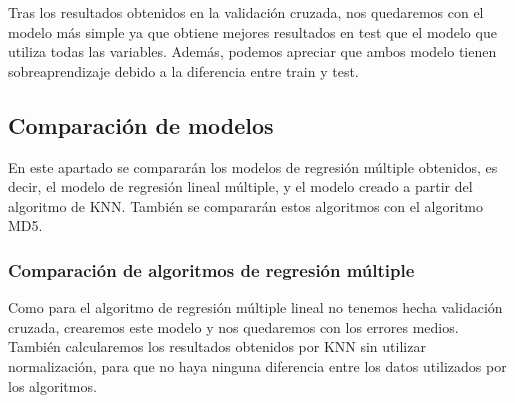 \documentclass[11pt]{article}
\begin{document}
    Tras los resultados obtenidos en la validación cruzada, nos quedaremos
con el modelo más simple ya que obtiene mejores resultados en test que
el modelo que utiliza todas las variables. Además, podemos apreciar que
ambos modelo tienen sobreaprendizaje debido a la diferencia entre train
y test.

    \hypertarget{comparaciuxf3n-de-modelos}{%
\subsection{Comparación de modelos}\label{comparaciuxf3n-de-modelos}}

En este apartado se compararán los modelos de regresión múltiple
obtenidos, es decir, el modelo de regresión lineal múltiple, y el modelo
creado a partir del algoritmo de KNN. También se compararán estos
algoritmos con el algoritmo MD5.

    \hypertarget{comparaciuxf3n-de-algoritmos-de-regresiuxf3n-muxfaltiple}{%
\subsubsection{Comparación de algoritmos de regresión
múltiple}\label{comparaciuxf3n-de-algoritmos-de-regresiuxf3n-muxfaltiple}}

Como para el algoritmo de regresión múltiple lineal no tenemos hecha
validación cruzada, crearemos este modelo y nos quedaremos con los
errores medios. También calcularemos los resultados obtenidos por KNN
sin utilizar normalización, para que no haya ninguna diferencia entre
los datos utilizados por los algoritmos.
\end{document}
